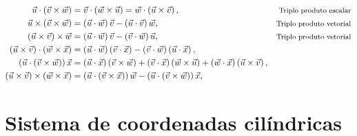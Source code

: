 \clearpage
\begin{subequations}\label{vectoridendities}
\begin{align}
 \vec{u}\cdot\left(\vec{v}\times\vec{w}\right)&=\vec{v}\cdot\left(\vec{w}\times\vec{u}\right)=\vec{w}\cdot\left(\vec{u}\times\vec{v}\right),&\hbox{\footnotesize Triplo produto escalar}\\ 
 \vec{u}\times\left(\vec{v}\times\vec{w}\right)&=\left(\vec{u}\cdot\vec{w}\right)\vec{v}-\left(\vec{u}\cdot\vec{v}\right)\vec{w},&\hbox{\footnotesize Triplo produto vetorial} \\ 
 \left(\vec{u}\times\vec{v}\right)\times\vec{w}&=\left(\vec{u}\cdot\vec{w}\right)\vec{v}-\left(\vec{v}\cdot\vec{w}\right)\vec{u},&\hbox{\footnotesize Triplo produto vetorial} \\ 
 \left(\vec{u}\times\vec{v}\right)\cdot\left(\vec{w}\times\vec{x}\right)&=\left(\vec{u}\cdot\vec{w}\right)\left(\vec{v}\cdot\vec{x}\right)-\left(\vec{v}\cdot\vec{w}\right)\left(\vec{u}\cdot\vec{x}\right),& \\	 
\left(\vec{u}\cdot\left(\vec{v}\times\vec{w}\right)\right)\vec{x}&=\left(\vec{u}\cdot\vec{x}\right)\left(\vec{v}\times\vec{w}\right)+\left(\vec{v}\cdot\vec{x}\right)\left(\vec{w}\times\vec{u}\right)+\left(\vec{w}\cdot\vec{x}\right)\left(\vec{u}\times\vec{v}\right),& \\
\left(\vec{u}\times\vec{v}\right)\times\left(\vec{w}\times\vec{x}\right)
&=\left(\vec{u}\cdot\left(\vec{v}\times\vec{x}\right)\right)\vec{w}-\left(\vec{u}\cdot\left(\vec{v}\times\vec{w}\right)\right)\vec{x},&\\
\end{align}
\end{subequations}
\newpage


\section{Sistema de coordenadas cilíndricas}

